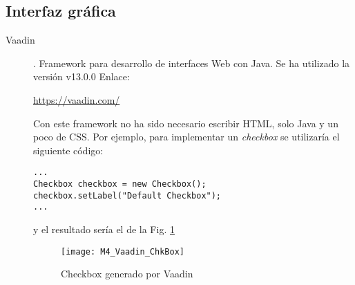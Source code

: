 \subsection{Interfaz gráfica}
\begin{description}
	\item[Vaadin]. Framework para desarrollo de interfaces Web con Java.
		Se ha utilizado la versión  v13.0.0 Enlace:
		
		\url{https://vaadin.com/}
		
		Con este framework no ha sido necesario escribir HTML, solo Java y un poco de CSS. Por ejemplo, para implementar un \textit{checkbox} se utilizaría el siguiente código:
		
\begin{minipage}{\linewidth}
{\tiny \begin{lstlisting}
...
Checkbox checkbox = new Checkbox();
checkbox.setLabel("Default Checkbox");
...
\end{lstlisting}}
\end{minipage}	
		y el resultado sería el de la Fig. \ref{fig:M4_Vaadin_ChkBox}
\begin{figure}[!h]
	\centering
	\texttt{[image: M4\_Vaadin\_ChkBox]}
	\caption{Checkbox generado por Vaadin}\label{fig:M4_Vaadin_ChkBox}
\end{figure}
\FloatBarrier

\end{description}
